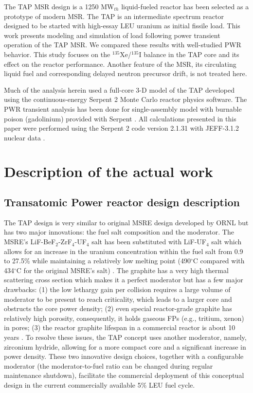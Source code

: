 \documentclass{anstrans}
\begin{document}
The \gls{TAP} \gls{MSR} design is a 1250 MW$_{th}$ liquid-fueled reactor has 
been selected as a prototype of modern \gls{MSR}. The \gls{TAP} is an 
intermediate spectrum reactor designed to be started with high-essay \gls{LEU} 
uranium as initial fissile load. This work presents modeling and simulation of 
load following power transient operation of the \gls{TAP} \gls{MSR}. We 
compared these results with well-studied \gls{PWR} behavior. This study 
focuses on the $^{135}$Xe/$^{135}$I balance in the \gls{TAP} core and its 
effect on the reactor performance. Another feature of the \gls{MSR}, its 
circulating liquid fuel and
corresponding delayed neutron precursor drift, is 
not treated
here.

Much of the analysis herein used a full-core 3-D model of the \gls{TAP}  
developed using the continuous-energy Serpent 2 Monte Carlo reactor physics 
software. The \gls{PWR} transient analysis has been done for single-assembly 
model with burnable poison (gadolinium) provided with Serpent 
\cite{leppanen_serpent_2015}. All calculations presented in this paper were 
performed using the Serpent 2 code version 2.1.31 with JEFF-3.1.2 nuclear data 
\cite{oecd/nea_data_bank_jeff-3.1.2_2014}.
\section{Description of the actual work}
\subsection{Transatomic Power reactor design description}
The \gls{TAP} design is very similar to original \gls{MSRE} design developed 
by \gls{ORNL} \cite{haubenreich_experience_1970} but has two major  
innovations: 
the fuel salt composition and the moderator. The \gls{MSRE}'s 
LiF-BeF$_2$-ZrF$_4$-UF$_4$ salt has been substituted with LiF-UF$_4$ salt 
which 
allows for an increase in the uranium concentration within the fuel salt from 
0.9 to 
27.5\% while maintaining a relatively low melting point (490$^{\circ}$C 
compared 
with 434$^{\circ}$C for the original \gls{MSRE}'s salt) 
\cite{betzler_two-dimensional_2016}. The graphite has a very high 
thermal scattering cross section which makes it a perfect moderator but has 
a few major drawbacks: 
(1) the low lethargy gain per collision requires a large volume of moderator 
to be present to reach criticality, which leads to a larger core and obstructs 
the core power density; (2) even special 
reactor-grade graphite has relatively high porosity, consequently, it holds
gaseous \glspl{FP} 
(e.g., tritium, xenon) in pores; (3) the reactor graphite lifespan in a 
commercial 
reactor is about 10 years \cite{robertson_conceptual_1971}. To resolve these 
issues, the \gls{TAP} concept uses another 
moderator, namely, zirconium hydride, allowing for a more compact core and a 
significant increase in power density. These two innovative design choices,  
together with a configurable moderator 
(the moderator-to-fuel ratio can be changed during regular maintenance 
shutdown), 
facilitate the commercial deployment of this conceptual design in the current 
commercially available 5\% \gls{LEU} fuel cycle. 
\end{document}
